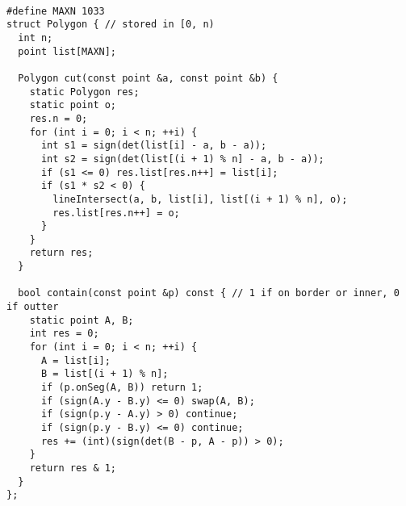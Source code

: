 \begin{lstlisting}

#define MAXN 1033
struct Polygon { // stored in [0, n)
  int n;
  point list[MAXN];

  Polygon cut(const point &a, const point &b) {
    static Polygon res;
    static point o;
    res.n = 0;
    for (int i = 0; i < n; ++i) {
      int s1 = sign(det(list[i] - a, b - a));
      int s2 = sign(det(list[(i + 1) % n] - a, b - a));
      if (s1 <= 0) res.list[res.n++] = list[i];
      if (s1 * s2 < 0) {
        lineIntersect(a, b, list[i], list[(i + 1) % n], o);
        res.list[res.n++] = o;
      }
    }
    return res;
  }

  bool contain(const point &p) const { // 1 if on border or inner, 0 if outter
    static point A, B;
    int res = 0;
    for (int i = 0; i < n; ++i) {
      A = list[i];
      B = list[(i + 1) % n];
      if (p.onSeg(A, B)) return 1;
      if (sign(A.y - B.y) <= 0) swap(A, B);
      if (sign(p.y - A.y) > 0) continue;
      if (sign(p.y - B.y) <= 0) continue;
      res += (int)(sign(det(B - p, A - p)) > 0);
    }
    return res & 1;
  }
};

\end{lstlisting}